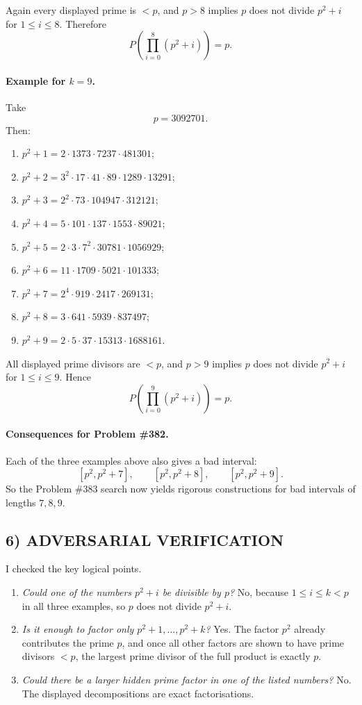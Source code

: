 Again every displayed prime is $<p$, and $p>8$ implies $p$ does not divide $p^2+i$ for $1\le i\le 8$. Therefore
\[
P\!\left(\prod_{i=0}^{8}(p^2+i)\right)=p.
\]

\paragraph{Example for $k=9$.}
Take
\[
p=3092701.
\]
Then:

\begin{enumerate}
\item $p^2+1=2\cdot 1373\cdot 7237\cdot 481301$;
\item $p^2+2=3^2\cdot 17\cdot 41\cdot 89\cdot 1289\cdot 13291$;
\item $p^2+3=2^2\cdot 73\cdot 104947\cdot 312121$;
\item $p^2+4=5\cdot 101\cdot 137\cdot 1553\cdot 89021$;
\item $p^2+5=2\cdot 3\cdot 7^2\cdot 30781\cdot 1056929$;
\item $p^2+6=11\cdot 1709\cdot 5021\cdot 101333$;
\item $p^2+7=2^4\cdot 919\cdot 2417\cdot 269131$;
\item $p^2+8=3\cdot 641\cdot 5939\cdot 837497$;
\item $p^2+9=2\cdot 5\cdot 37\cdot 15313\cdot 1688161$.
\end{enumerate}

All displayed prime divisors are $<p$, and $p>9$ implies $p$ does not divide $p^2+i$ for $1\le i\le 9$. Hence
\[
P\!\left(\prod_{i=0}^{9}(p^2+i)\right)=p.
\]

\paragraph{Consequences for Problem \#382.}
Each of the three examples above also gives a bad interval:
\[
[p^2,p^2+7],\qquad [p^2,p^2+8],\qquad [p^2,p^2+9].
\]
So the Problem \#383 search now yields rigorous constructions for bad intervals of lengths $7,8,9$.

\subsection*{6) ADVERSARIAL VERIFICATION}

I checked the key logical points.

\begin{enumerate}
\item \emph{Could one of the numbers $p^2+i$ be divisible by $p$?} No, because $1\le i\le k<p$ in all three examples, so $p$ does not divide $p^2+i$.
\item \emph{Is it enough to factor only $p^2+1,\dots,p^2+k$?} Yes. The factor $p^2$ already contributes the prime $p$, and once all other factors are shown to have prime divisors $<p$, the largest prime divisor of the full product is exactly $p$.
\item \emph{Could there be a larger hidden prime factor in one of the listed numbers?} No. The displayed decompositions are exact factorisations.
\end{enumerate}

